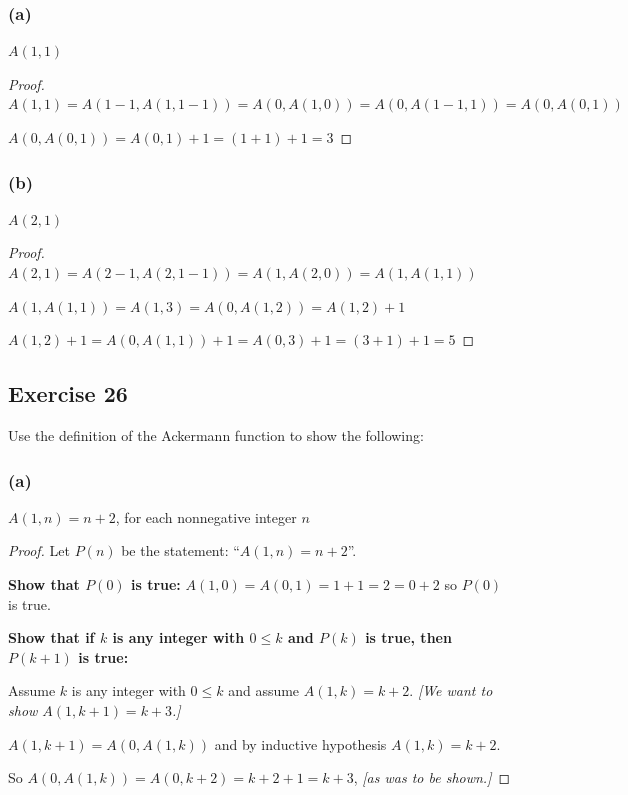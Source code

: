 \documentclass[14pt]{extarticle}
\begin{document}
\subsubsection{(a)}
$A(1, 1)$

\begin{proof}
\(A(1, 1) = A(1-1, A(1, 1-1)) = A(0, A(1, 0)) = A(0, A(1-1, 1)) = A(0, A(0, 1))\)

\(A(0, A(0, 1)) = A(0, 1) + 1 = (1 + 1) + 1 = 3\)
\end{proof}

\subsubsection{(b)}
$A(2, 1)$

\begin{proof}
\(A(2, 1) = A(2-1, A(2, 1-1)) = A(1, A(2, 0)) = A(1, A(1, 1))\)

\(A(1, A(1, 1)) = A(1, 3) = A(0, A(1, 2)) = A(1, 2) + 1\)

\(A(1, 2) + 1 = A(0, A(1, 1)) + 1 = A(0, 3) + 1 = (3 + 1) + 1 = 5\)
\end{proof}

\subsection{Exercise 26}
Use the definition of the Ackermann function to show the following:

\subsubsection{(a)}
\(A(1, n) = n + 2\), for each nonnegative integer $n$

\begin{proof}
Let $P(n)$ be the statement: ``\(A(1, n) = n + 2\)''.

{\bf Show that $P(0)$ is true:} \(A(1, 0) = A(0, 1) = 1 + 1 = 2 = 0 + 2\) so $P(0)$ is true.

{\bf Show that if $k$ is any integer with \(0 \leq k\) and $P(k)$ is true, then $P(k+1)$ is true:}

Assume $k$ is any integer with \(0 \leq k\) and assume \(A(1, k) = k + 2\). {\it [We want to show \(A(1, k+1) = k+3\).]}

\(A(1, k+1) = A(0, A(1, k))\) and by inductive hypothesis \(A(1, k) = k+2\). 

So \(A(0, A(1, k)) = A(0, k+2) = k+2+1 = k+3\), {\it [as was to be shown.]}
\end{proof}
\end{document}
